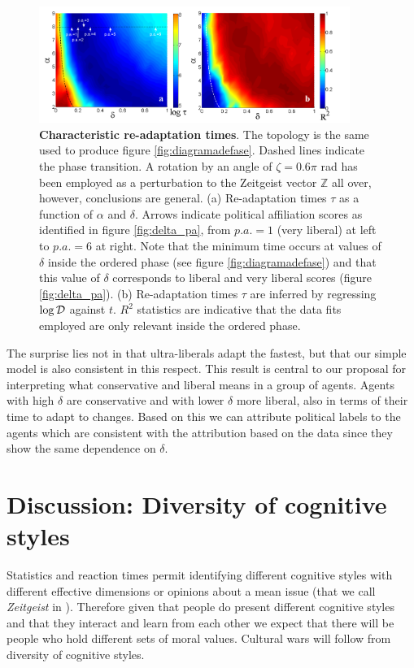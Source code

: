 \documentclass[twocolumn,showpacs]{revtex4-1}
\begin{document}
\begin{widetext}
\begin{figure}[!ht]
\centering \includegraphics[width=0.9\textwidth]{fig9_relaxtime.png}
\centering \caption{{\bf Characteristic re-adaptation times}. The topology is the same used to produce figure \ref{fig:diagramadefase}. Dashed lines
 indicate the phase transition. A rotation by an angle of  $\zeta=0.6 \pi$ rad has
 been employed as a perturbation to the Zeitgeist vector $\mathbb{Z}$ all over, however, conclusions are general.
(a) Re-adaptation times $\tau$ as a function of $\alpha$ and $\delta$. Arrows indicate political affiliation scores as
 identified in figure \ref{fig:delta_pa}, from $p.a.=1$ (very liberal) at left to $p.a.=6$ at right. Note that the minimum time occurs at 
values of $\delta$ inside the ordered phase (see figure \ref{fig:diagramadefase}) and that 
this value of $\delta$ corresponds to liberal and very liberal scores (figure \ref{fig:delta_pa}). (b) Re-adaptation times $\tau$ are inferred by 
regressing $\log {\cal D}$ against $t$. $R^2$ statistics are indicative that the data fits employed are only relevant inside the ordered phase.}
\label{taudelta}
\end{figure}
\end{widetext}


The surprise lies not in that ultra-liberals adapt the fastest, but
that our simple model is also consistent in this respect. 
This result is central to our proposal for interpreting  what conservative and liberal
means in a group of agents. Agents with high $\delta$ are conservative
and with lower $\delta$ more liberal, also in terms of their time to
adapt to changes. Based on this we can attribute political labels
to the agents which are consistent
with the attribution based on the data since
they show the same dependence on $\delta$. 







\section{ Discussion: Diversity of cognitive styles }
\label{sec:discussion}
Statistics and reaction times permit identifying different
cognitive styles with different effective dimensions or opinions
about a mean issue (that we call {\it Zeitgeist} in \cite{Cavi10}). 
Therefore given that people do present 
different cognitive styles and that they interact and learn from each other
we expect  
that there will be people who hold different  sets of moral values.
Cultural wars will follow from diversity of cognitive styles. 
\end{document}

